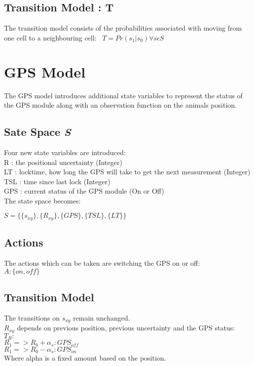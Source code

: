 \documentclass[12pt,openany,a4paper]{book}
\begin{document}
\subsection*{Transition Model : T}
The transition model consists of the probabilities associated with moving from one cell to a neighbouring cell: \
\ensuremath{ T = Pr( s_1 | s_0)  \forall  s  \epsilon S }

\section{GPS Model}
The GPS model introduces additional state variables to represent the status of the GPS module along with an observation function on the animals position.

\subsection*{Sate Space \emph{S}}
Four new state variables are introduced:\\
R : the positional uncertainty (Integer) \\
LT : locktime, how long the GPS will take to get the next measurement (Integer)\\
TSL : time since last lock (Integer)\\
GPS : current status of the GPS module (On or Off)  \\
The state space becomes:

\ensuremath{ S = \{\{ s_{xy}\} ,\{R_{xy} \} , \{ GPS \} , \{ TSL \}, \{ LT \} \}}

\subsection*{Actions}
The actions which can be taken are switching the GPS on or off: \\
\ensuremath{ A : \{on , off \} }

\subsection*{Transition Model}
The transitions on \ensuremath{ s_{xy}} remain unchanged. \\
\ensuremath{R_{xy}}  depends on previous position, previous uncertainty and the GPS status:\\
\ensuremath{T_{R} :} \\
\ensuremath{R_1 => R_0 + \alpha_s : GPS_{off} }\\
\indent \ensuremath{R_1 => R_0 - \alpha_s : GPS_{on} }\\
Where alpha is a fixed amount based on the position.
\end{document}
